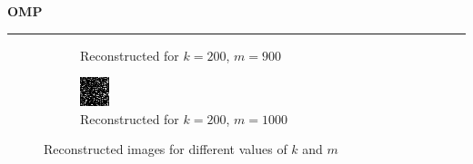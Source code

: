 \documentclass[a4paper,12pt]{article}
\newenvironment{solution}[2][]{%
    \begin{mdframed}[linecolor=blue!70!black, linewidth=2pt, roundcorner=10pt, backgroundcolor=yellow!10!white, skipabove=12pt, skipbelow=12pt]%
        \textbf{\large #2}
        \par\noindent\rule{\textwidth}{0.4pt}
}{
    \end{mdframed}
}
\begin{document}
\begin{solution}{OMP}
\begin{figure}[H]
\begin{subfigure}[t]{0.23\textwidth}
        \caption{Reconstructed for $k = 200$, $m = 900$}
    \end{subfigure}
    \begin{subfigure}[t]{0.23\textwidth}
        \centering
        \includegraphics[width=\textwidth]{../images/omp/Reconstructed_k_200_m_1000.png}
        \caption{Reconstructed for $k = 200$, $m = 1000$}
    \end{subfigure}
    \caption{Reconstructed images for different values of $k$ and $m$}
    \label{fig:reconstructed_all2}
\end{figure}
\end{solution}
\end{document}
